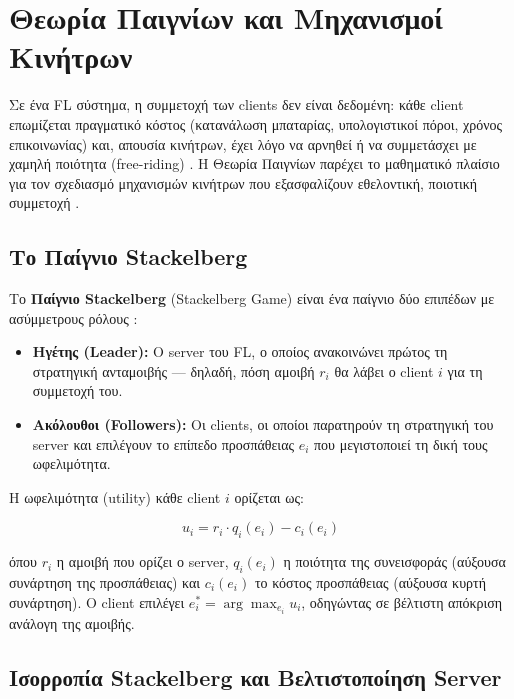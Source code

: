 
\section{Θεωρία Παιγνίων και Μηχανισμοί Κινήτρων}
\label{sec:game_theory}

Σε ένα FL σύστημα, η συμμετοχή των clients δεν είναι δεδομένη:
κάθε client επωμίζεται πραγματικό κόστος (κατανάλωση μπαταρίας,
υπολογιστικοί πόροι, χρόνος επικοινωνίας) και, απουσία κινήτρων,
έχει λόγο να αρνηθεί ή να συμμετάσχει με χαμηλή ποιότητα
(free-riding) \cite{Kang2019}. Η Θεωρία Παιγνίων παρέχει το
μαθηματικό πλαίσιο για τον σχεδιασμό μηχανισμών κινήτρων που
εξασφαλίζουν εθελοντική, ποιοτική συμμετοχή \cite{Zhan2023}.

\subsection{Το Παίγνιο Stackelberg}
\label{subsec:stackelberg}

Το \textbf{Παίγνιο Stackelberg} (Stackelberg Game) είναι ένα
παίγνιο δύο επιπέδων με ασύμμετρους ρόλους \cite{Sarikaya2020}:

\begin{itemize}
    \item \textbf{Ηγέτης (Leader):} Ο server του FL, ο οποίος
    ανακοινώνει πρώτος τη στρατηγική ανταμοιβής — δηλαδή, πόση
    αμοιβή $r_i$ θα λάβει ο client $i$ για τη συμμετοχή του.

    \item \textbf{Ακόλουθοι (Followers):} Οι clients, οι οποίοι
    παρατηρούν τη στρατηγική του server και επιλέγουν το επίπεδο
    προσπάθειας $e_i$ που μεγιστοποιεί τη δική τους ωφελιμότητα.
\end{itemize}

Η ωφελιμότητα (utility) κάθε client $i$ ορίζεται ως:

\begin{equation}
    \label{eq:client_utility}
    u_i = r_i \cdot q_i(e_i) - c_i(e_i)
\end{equation}

\noindent όπου $r_i$ η αμοιβή που ορίζει ο server, $q_i(e_i)$ η
ποιότητα της συνεισφοράς (αύξουσα συνάρτηση της προσπάθειας) και
$c_i(e_i)$ το κόστος προσπάθειας (αύξουσα κυρτή συνάρτηση). Ο
client επιλέγει $e_i^* = \arg\max_{e_i} u_i$, οδηγώντας σε
βέλτιστη απόκριση ανάλογη της αμοιβής.

\subsection{Ισορροπία Stackelberg και Βελτιστοποίηση Server}
\label{subsec:stackelberg_eq}

